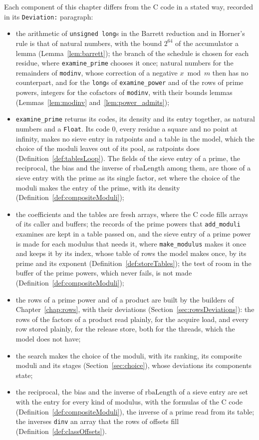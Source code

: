 Each component of this chapter differs from the C code in a stated way, recorded in its
\verb|Deviation:| paragraph:
\begin{itemize}
  \item the arithmetic of \verb|unsigned long|s in the Barrett reduction and in Horner's rule is
    that of natural numbers, with the bound $2^{64}$ of the accumulator a lemma
    (Lemma~\ref{lem:barrett}); the branch of the schedule is chosen for each residue, where
    \verb|examine_prime| chooses it once; natural numbers for the remainders of \verb|modinv|, whose
    correction of a negative $x \bmod m$ then has no counterpart, and for the \verb|long|s of
    \verb|examine_power| and of the rows of prime powers, integers for the cofactors of
    \verb|modinv|, with their bounds lemmas (Lemmas~\ref{lem:modinv} and~\ref{lem:power_admits});
  \item \verb|examine_prime| returns its codes, its density and its entry together, as natural
    numbers and a \verb|Float|. Its code $0$, every residue a square and no point at infinity, makes
    no sieve entry in ratpoints and a table in the model, which the choice of the moduli leaves out
    of its pool, as ratpoints does (Definition~\ref{def:tablesLoop}). The fields of the sieve entry
    of a prime, the reciprocal, the bias and the inverse of $\mathrm{rbaLength}$ among them, are
    those of a sieve entry with the prime as its single factor, set where the choice of the moduli
    makes the entry of the prime, with its density (Definition~\ref{def:compositeModuli});
  \item the coefficients and the tables are fresh arrays, where the C code fills arrays of its
    caller and buffers; the records of the prime powers that \verb|add_moduli| examines are kept in
    a table passed on, and the sieve entry of a prime power is made for each modulus that needs it,
    where \verb|make_modulus| makes it once and keeps it by its index, whose table of rows the model
    makes once, by its prime and its exponent (Definition~\ref{def:storeTables}); the test of room
    in the buffer of the prime powers, which never fails, is not made
    (Definition~\ref{def:compositeModuli});
  \item the rows of a prime power and of a product are built by the builders of
    Chapter~\ref{chap:rows}, with their deviations (Section~\ref{sec:rowsDeviations}): the rows of
    the factors of a product read plainly, for the acquire load, and every row stored plainly, for
    the release store, both for the threads, which the model does not have;
  \item the search makes the choice of the moduli, with its ranking, its composite moduli and its
    stages (Section~\ref{sec:choice}), whose deviations its components state;
  \item the reciprocal, the bias and the inverse of $\mathrm{rbaLength}$ of a sieve entry are set
    with the entry for every kind of modulus, with the formulas of the C code
    (Definition~\ref{def:compositeModuli}), the inverse of a prime read from its table; the inverses
    \verb|dinv| an array that the rows of offsets fill (Definition~\ref{def:classOffsets}).
\end{itemize}

